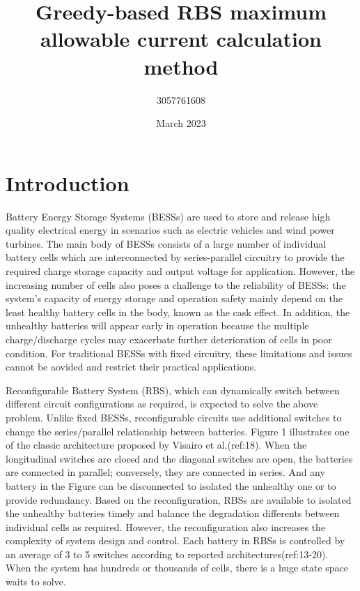 \documentclass{article}
\title{Greedy-based RBS maximum allowable current calculation method}
\author{3057761608 }
\date{March 2023}
\begin{document}
\maketitle

\section{Introduction}

Battery Energy Storage Systems (BESSs) are used to store and release high quality electrical energy  in scenarios such as electric vehicles and wind power turbines.
The main body of BESSs consists of a large number of individual battery cells which are interconnected by series-parallel circuitry to provide the required charge storage capacity and output voltage for application.
However, the increasing number of cells also poses a challenge to the reliability of BESSs: the system's capacity of energy storage and operation safety mainly  depend on the least healthy battery cells in the body, known as the cask effect. 
In addition, the unhealthy batteries will appear early in operation because the multiple charge/discharge cycles may exacerbate further deterioration of  cells in poor condition.
For traditional BESSs with fixed circuitry, these limitations and issues cannot be aovided and restrict their practical applications.


Reconfigurable Battery System (RBS), which can dynamically  switch between different circuit configurations as required, is expected to solve the above problem. 
Unlike fixed BESSs, reconfigurable circuits use additional switches to change the series/parallel relationship between batteries.
Figure 1 illustrates one of the classic architecture proposed by Visairo et al.(ref:18). %
When the longitudinal switches are cloesd and the diagonal switches are open, the batteries are connected in parallel; conversely, they are connected in series.
And any battery in the Figure can be disconnected to isolated the unhealthy one or to provide redundancy.
Based on the reconfiguration, RBSs are available to isolated the unhealthy batteries timely and balance the degradation differents between individual cells as required.
However, the reconfiguration also increases the complexity of system design and control.
Each battery in RBSs is controlled by an average of 3 to 5 switches according to reported architectures(ref:13-20).
When the system has hundreds or thousands of cells, there is a huge state space waits to solve.
\end{document}
